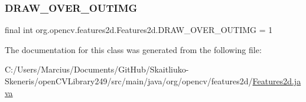 \subsubsection{\texorpdfstring{D\+R\+A\+W\+\_\+\+O\+V\+E\+R\+\_\+\+O\+U\+T\+I\+MG}{DRAW\_OVER\_OUTIMG}}
{\footnotesize\ttfamily final int org.\+opencv.\+features2d.\+Features2d.\+D\+R\+A\+W\+\_\+\+O\+V\+E\+R\+\_\+\+O\+U\+T\+I\+MG = 1\hspace{0.3cm}{\ttfamily [static]}}



The documentation for this class was generated from the following file\+:\begin{DoxyCompactItemize}
\item 
C\+:/\+Users/\+Marcius/\+Documents/\+Git\+Hub/\+Skaitliuko-\/\+Skeneris/open\+C\+V\+Library249/src/main/java/org/opencv/features2d/\mbox{\hyperlink{_features2d_8java}{Features2d.\+java}}\end{DoxyCompactItemize}
